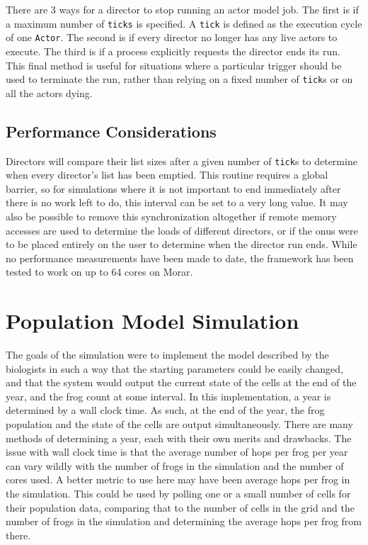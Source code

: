 \documentclass[12pt,a4paper]{article}
\newcommand{\term}[1]{\texttt{#1}}
\begin{document}
There are 3 ways for a director to stop running an actor model job.
The first is if a maximum number of \term{ticks} is specified.
A \term{tick} is defined as the execution cycle of one \term{Actor}.
The second is if every director no longer has any live actors to
execute.
The third is if a process explicitly requests the director ends
its run.
This final method is useful for situations where a particular trigger
should be used to terminate the run, rather than relying on a fixed
number of \term{tick}s or on all the actors dying.


\subsection{Performance Considerations}
Directors will compare their list sizes after a given number of \term{tick}s
to determine when every director's list has been emptied.
This routine requires a global barrier, so for simulations where it
is not important to end immediately after there is no work left to do,
this interval can be set to a very long value.
It may also be possible to remove this synchronization altogether
if remote memory accesses are used to determine the loads of different
directors, or if the onus were to be placed entirely on the user
to determine when the director run ends.
While no performance measurements have been made to date,
the framework has been tested to work on up to 64 cores on Morar.


\section{Population Model Simulation}
The goals of the simulation were to implement the model described by
the biologists in such a way that the starting parameters could
be easily changed, and that the system would output the current state
of the cells at the end of the year, and the frog count at some interval.
In this implementation, a year is determined by a wall clock time.
As such, at the end of the year, the frog population and the state
of the cells are output simultaneously.
There are many methods of determining a year, each with their own
merits and drawbacks.
The issue with wall clock time is that the average number of hops
per frog per year can vary wildly with the number of frogs in the
simulation and the number of cores used.
A better metric to use here may have been average hops per frog in
the simulation.
This could be used by polling one or a small number of cells for their
population data, comparing that to the number of cells in the grid and
the number of frogs in the simulation and determining the average
hops per frog from there.
\end{document}
